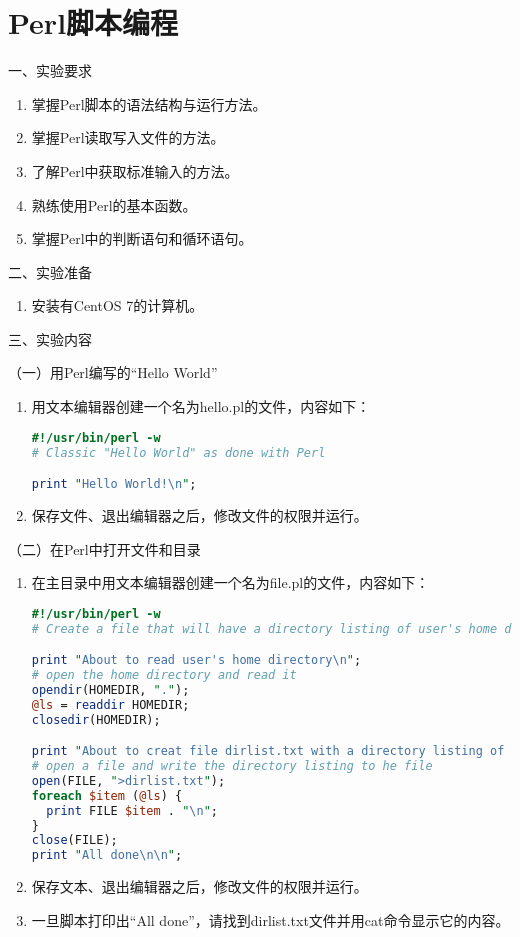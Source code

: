 \chapter{Perl脚本编程}

\noindent
一、实验要求
\begin{enumerate}
  \item 掌握Perl脚本的语法结构与运行方法。
  \item 掌握Perl读取写入文件的方法。
  \item 了解Perl中获取标准输入的方法。
  \item 熟练使用Perl的基本函数。
  \item 掌握Perl中的判断语句和循环语句。
\end{enumerate}

\vspace{0.2in}
\noindent
二、实验准备
\begin{enumerate}
  \item 安装有CentOS 7的计算机。
\end{enumerate}

\vspace{0.2in}
\noindent
三、实验内容

\vspace{0.1in}
（一）用Perl编写的``Hello World''
\begin{enumerate}
  \item 用文本编辑器创建一个名为hello.pl的文件，内容如下：
\begin{lstlisting}[language=perl]
#!/usr/bin/perl -w
# Classic "Hello World" as done with Perl

print "Hello World!\n";
\end{lstlisting}
  \item 保存文件、退出编辑器之后，修改文件的权限并运行。
\end{enumerate}

\vspace{0.1in}
（二）在Perl中打开文件和目录
\begin{enumerate}
  \item 在主目录中用文本编辑器创建一个名为file.pl的文件，内容如下：
\begin{lstlisting}[language=perl]
#!/usr/bin/perl -w
# Create a file that will have a directory listing of user's home dir

print "About to read user's home directory\n";
# open the home directory and read it
opendir(HOMEDIR, ".");
@ls = readdir HOMEDIR;
closedir(HOMEDIR);

print "About to creat file dirlist.txt with a directory listing of user's home dir\n";
# open a file and write the directory listing to he file
open(FILE, ">dirlist.txt");
foreach $item (@ls) {
  print FILE $item . "\n";
}
close(FILE);
print "All done\n\n";
\end{lstlisting}
  \item 保存文本、退出编辑器之后，修改文件的权限并运行。
  \item 一旦脚本打印出“All done”，请找到dirlist.txt文件并用cat命令显示它的内容。
\end{enumerate}

